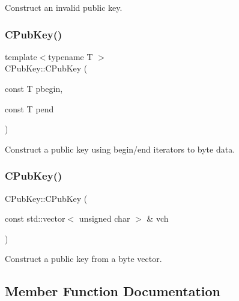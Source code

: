 Construct an invalid public key. 

\mbox{\label{class_c_pub_key_a8c7527b40c96bfb8f48b669764301df8}} 
\subsubsection{\texorpdfstring{C\+Pub\+Key()}{CPubKey()}\hspace{0.1cm}{\footnotesize\ttfamily [2/3]}}
{\footnotesize\ttfamily template$<$typename T $>$ \\
C\+Pub\+Key\+::\+C\+Pub\+Key (\begin{DoxyParamCaption}\item[{const T}]{pbegin,  }\item[{const T}]{pend }\end{DoxyParamCaption})\hspace{0.3cm}{\ttfamily [inline]}}



Construct a public key using begin/end iterators to byte data. 

\mbox{\label{class_c_pub_key_a31307d0318ebda95c7e34ef1554fe2d2}} 
\subsubsection{\texorpdfstring{C\+Pub\+Key()}{CPubKey()}\hspace{0.1cm}{\footnotesize\ttfamily [3/3]}}
{\footnotesize\ttfamily C\+Pub\+Key\+::\+C\+Pub\+Key (\begin{DoxyParamCaption}\item[{const std\+::vector$<$ unsigned char $>$ \&}]{vch }\end{DoxyParamCaption})\hspace{0.3cm}{\ttfamily [inline]}}



Construct a public key from a byte vector. 



\subsection{Member Function Documentation}
\mbox{\label{class_c_pub_key_a859ab9909d68092d6d4fc739237ab358}} 
